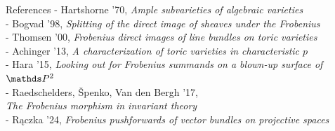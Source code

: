 \documentclass[beamer]{paper}
\begin{document}
\begin{frame}[t]{References}
  \scriptsize{
    - Hartshorne '70, \hfill\textit{Ample subvarieties of algebraic varieties} \\[1.5em]
    - Bogvad '98, \hfill\textit{Splitting of the direct image of sheaves under the Frobenius} \\[1.5em]
    - Thomsen '00, \hfill\textit{Frobenius direct images of line bundles on toric varieties} \\[1.5em]
    - Achinger '13, \hfill\textit{A characterization of toric varieties in characteristic $p$} \\[1.5em]
    - Hara '15, \hfill\textit{Looking out for Frobenius summands on a blown-up surface of $\PP2$} \\[1.5em]
    - Raedschelders, Špenko, Van den Bergh '17, \\ \hfill\textit{The Frobenius morphism in invariant theory} \\[0.5em]
    - Rączka '24, \hfill\textit{Frobenius pushforwards of vector bundles on projective spaces}
  }

  \renewcommand{\section}{\subsection}
  \printbibliography
\end{frame}
\end{document}
